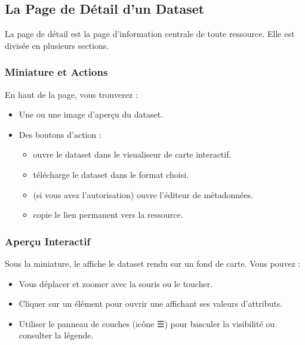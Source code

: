 \documentclass[letterpaper,10pt,english]{sphinxmanual}
\begin{document}
\subsection{La Page de Détail d’un Dataset}
\label{\detokenize{fr/02_trouver_visualiser:la-page-de-detail-d-un-dataset}}
\sphinxAtStartPar
La page de détail est la page d’information centrale de toute ressource. Elle est
divisée en plusieurs sections.


\subsubsection{Miniature et Actions}
\label{\detokenize{fr/02_trouver_visualiser:miniature-et-actions}}
\sphinxAtStartPar
En haut de la page, vous trouverez :
\begin{itemize}
\item {} 
\sphinxAtStartPar
Une  ou une image d’aperçu du dataset.

\item {} 
\sphinxAtStartPar
Des boutons d’action :
\begin{itemize}
\item {} 
\sphinxAtStartPar
{} \textendash{} ouvre le dataset dans le visualiseur de carte interactif.

\item {} 
\sphinxAtStartPar
{} \textendash{} télécharge le dataset dans le format choisi.

\item {} 
\sphinxAtStartPar
{} (si vous avez l’autorisation) \textendash{} ouvre l’éditeur de métadonnées.

\item {} 
\sphinxAtStartPar
{} \textendash{} copie le lien permanent vers la ressource.

\end{itemize}

\end{itemize}


\subsubsection{Aperçu Interactif}
\label{\detokenize{fr/02_trouver_visualiser:apercu-interactif}}
\sphinxAtStartPar
Sous la miniature, le  affiche le dataset rendu sur un
fond de carte. Vous pouvez :
\begin{itemize}
\item {} 
\sphinxAtStartPar
Vous déplacer et zoomer avec la souris ou le toucher.

\item {} 
\sphinxAtStartPar
Cliquer sur un élément pour ouvrir une  affichant ses valeurs
d’attributs.

\item {} 
\sphinxAtStartPar
Utiliser le panneau de couches (icône ☰) pour basculer la visibilité ou consulter
la légende.

\end{itemize}
\end{document}
